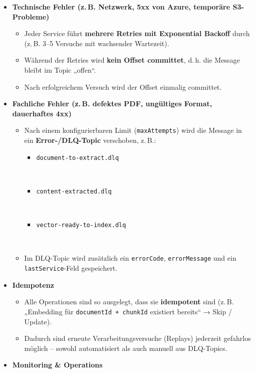 \begin{itemize}
\tightlist
\item
  \textbf{Technische Fehler (z.\,B. Netzwerk, 5xx von Azure, temporäre
  S3-Probleme)}

  \begin{itemize}
  \tightlist
  \item
    Jeder Service führt \textbf{mehrere Retries mit Exponential Backoff}
    durch (z.\,B. 3--5 Versuche mit wachsender Wartezeit).\\
  \item
    Während der Retries wird \textbf{kein Offset committet}, d.\,h. die
    Message bleibt im Topic „offen``.\\
  \item
    Nach erfolgreichem Versuch wird der Offset einmalig committet.
  \end{itemize}
\item
  \textbf{Fachliche Fehler (z.\,B. defektes PDF, ungültiges Format,
  dauerhaftes 4xx)}

  \begin{itemize}
  \tightlist
  \item
    Nach einem konfigurierbaren Limit (\texttt{maxAttempts}) wird die
    Message in ein \textbf{Error-/DLQ-Topic} verschoben, z.\,B.:

    \begin{itemize}
    \tightlist
    \item
      \texttt{document-to-extract.dlq}\strut \\
    \item
      \texttt{content-extracted.dlq}\strut \\
    \item
      \texttt{vector-ready-to-index.dlq}\strut \\
    \end{itemize}
  \item
    Im DLQ-Topic wird zusätzlich ein \texttt{errorCode},
    \texttt{errorMessage} und ein \texttt{lastService}-Feld gespeichert.
  \end{itemize}
\item
  \textbf{Idempotenz}

  \begin{itemize}
  \tightlist
  \item
    Alle Operationen sind so ausgelegt, dass sie \textbf{idempotent}
    sind (z.\,B. „Embedding für \texttt{documentId\ +\ chunkId}
    existiert bereits`` → Skip / Update).\\
  \item
    Dadurch sind erneute Verarbeitungsversuche (Replays) jederzeit
    gefahrlos möglich -- sowohl automatisiert als auch manuell aus
    DLQ-Topics.
  \end{itemize}
\item
  \textbf{Monitoring \& Operations}


\end{itemize}
